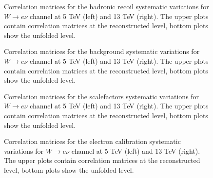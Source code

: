  \begin{figure}[pt]
	\caption{Correlation matrices for the hadronic recoil systematic variations for $W\rightarrow e\nu$ channel at 5 TeV (left) and 13 TeV (right). The upper plots contain correlation matrices at the reconstructed level, bottom plots show the unfolded level.}
	\label{fig:HR_syst}
\end{figure}

 \begin{figure}[pt]
	\caption{Correlation matrices for the background systematic variations for $W\rightarrow e\nu$ channel at 5 TeV (left) and 13 TeV (right). The upper plots contain correlation matrices at the reconstructed level, bottom plots show the unfolded level.}
	\label{fig:BG_syst}
\end{figure}

 \begin{figure}[pt]
	\caption{Correlation matrices for the scalefactors systematic variations for $W\rightarrow e\nu$ channel at 5 TeV (left) and 13 TeV (right). The upper plots contain correlation matrices at the reconstructed level, bottom plots show the unfolded level.}
	\label{fig:SF_syst}
\end{figure}

 \begin{figure}[pt]
	\caption{Correlation matrices for the electron calibration systematic variations for $W\rightarrow e\nu$ channel at 5 TeV (left) and 13 TeV (right). The upper plots contain correlation matrices at the reconstructed level, bottom plots show the unfolded level.}
	\label{fig:Calib_syst}
\end{figure}

